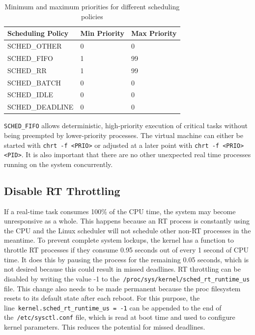 \documentclass[MMR,Master,english]{twbook}
\begin{document}
\begin{table}[H]
	\centering
	\caption{Minimum and maximum priorities for different scheduling policies}
	\label{tab:scheduling_priorities}
	\setlength{\tabcolsep}{0.5em} %
	{\renewcommand{\arraystretch}{1.2}%
		\begin{tabular}{|l|l|l|}
			\hline
			\textbf{Scheduling Policy} & \textbf{Min Priority} & \textbf{Max Priority} \\ \hline
			SCHED\_OTHER               & 0                     & 0                     \\ \hline
			SCHED\_FIFO                & 1                     & 99                    \\ \hline
			SCHED\_RR                  & 1                     & 99                    \\ \hline
			SCHED\_BATCH               & 0                     & 0                     \\ \hline
			SCHED\_IDLE                & 0                     & 0                     \\ \hline
			SCHED\_DEADLINE            & 0                     & 0                     \\ \hline
		\end{tabular}}
\end{table}

\noindent \texttt{SCHED\_FIFO} allows deterministic, high-priority execution of critical tasks without being preempted by lower-priority processes. The virtual machine can either be started with \texttt{chrt -f <PRIO>} or adjusted at a later point with \texttt{chrt -f <PRIO> <PID>}. It is also important that there are no other unexpected real time processes running on the system concurrently.
\subsection{Disable RT Throttling}
If a real-time task consumes 100\% of the CPU time, the system may become unresponsive as a whole. This happens because an RT process is constantly using the CPU and the Linux scheduler will not schedule other non-RT processes in the meantime. To prevent complete system lockups, the kernel has a function to throttle RT processes if they consume 0.95 seconds out of every 1 second of CPU time. It does this by pausing the process for the remaining 0.05 seconds, which is not desired because this could result in missed deadlines. RT throttling can be disabled by  writing the value -1 to the~\texttt{/proc/sys/kernel/sched\_rt\_runtime\_us} file. This change also needs to be made permanent because the proc filesystem resets to its default state after each reboot. For this purpose, the line~\texttt{kernel.sched\_rt\_runtime\_us = -1} can be appended to the end of the~\texttt{/etc/sysctl.conf} file, which is read at boot time and used to configure kernel parameters. This reduces the potential for missed deadlines.
\end{document}
